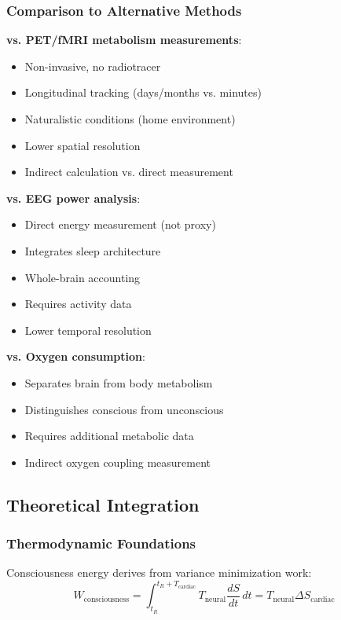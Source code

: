 \documentclass[12pt]{article}
\theoremstyle{remark}
\begin{document}
\subsubsection{Comparison to Alternative Methods}

\textbf{vs. PET/fMRI metabolism measurements}:
\begin{itemize}
\item [\checkmark] Non-invasive, no radiotracer
\item [\checkmark] Longitudinal tracking (days/months vs. minutes)
\item [\checkmark] Naturalistic conditions (home environment)
\item [×] Lower spatial resolution
\item [×] Indirect calculation vs. direct measurement
\end{itemize}

\textbf{vs. EEG power analysis}:
\begin{itemize}
\item [\checkmark] Direct energy measurement (not proxy)
\item [\checkmark] Integrates sleep architecture
\item [\checkmark] Whole-brain accounting
\item [×] Requires activity data
\item [×] Lower temporal resolution
\end{itemize}

\textbf{vs. Oxygen consumption}:
\begin{itemize}
\item [\checkmark] Separates brain from body metabolism
\item [\checkmark] Distinguishes conscious from unconscious
\item [×] Requires additional metabolic data
\item [×] Indirect oxygen coupling measurement
\end{itemize}

\subsection{Theoretical Integration}

\subsubsection{Thermodynamic Foundations}

Consciousness energy derives from variance minimization work:
\begin{equation}
W_{\text{consciousness}} = \int_{t_R}^{t_R + T_{\text{cardiac}}} T_{\text{neural}} \frac{dS}{dt} \, dt = T_{\text{neural}} \Delta S_{\text{cardiac}}
\end{equation}
\end{document}
